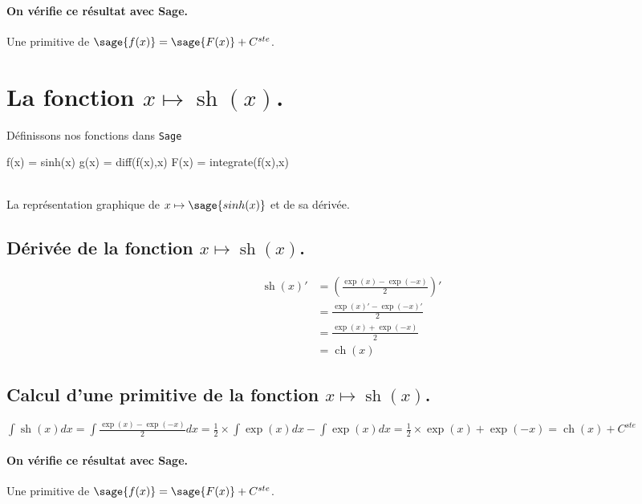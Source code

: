 \documentclass[a4paper,landscape,17pt]{extreport} %
\renewcommand{\sinh}{\mathop{\mathrm{sh}}}
\renewcommand{\cosh}{\mathop{\mathrm{ch}}}
\begin{document}
\paragraph{On vérifie ce résultat avec Sage.}
Une primitive de $\sage{f(x)} = \sage{F(x)} + C^{ste}$.





\section{La fonction  $x \mapsto \sinh(x)$.}
Définissons nos fonctions dans {\texttt{Sage}}
\begin{sageblock}
    f(x) = sinh(x)
    g(x) = diff(f(x),x)
    F(x) = integrate(f(x),x)
\end{sageblock}

\begin{center}
 \\
La représentation graphique de $x \mapsto \sage{sinh(x)} $ et de sa dérivée. 
\end{center}


\subsection{Dérivée de la fonction $x \mapsto \sinh(x)$.}
\begin{align*}
\sinh(x)' & = \left( \frac{\exp(x)-\exp(-x)}{2} \right)' \\ 
& = \frac{\exp(x)'-\exp(-x)'}{2} \\
& = \frac{\exp(x)+\exp(-x)}{2} \\
& = \cosh(x)
\end{align*}


\subsection{Calcul d'une primitive de la fonction  $x \mapsto \sinh(x)$.}
$\int \sinh(x) dx = \int \frac{\exp(x)- \exp(-x)}{2} dx = \frac{1}{2} \times \int \exp(x) dx - \int \exp(x) dx = \frac{1}{2} \times \exp(x) + \exp(-x) = \cosh(x) + C^{ste}$
\paragraph{On vérifie ce résultat avec Sage.}
Une primitive de $\sage{f(x)} = \sage{F(x)} + C^{ste}$.
\end{document}

